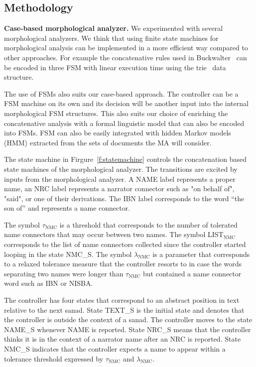 \documentclass[12pt]{article}
\begin{document}
\subsection{Methodology}

\begin{figure}
\end{figure}

{\bf Case-based morphological analyzer.}
We experimented with several morphological analyzers.
We think that using finite state machines for morphological analysis
can be implemented in a more efficient way compared to other 
approaches. 
For example the concatenative rules used in Buckwalter~\cite{Tim04}
can be encoded in three FSM with linear execution time using 
the trie~\cite{datries} data structure. 

The use of FSMs also suits our case-based approach. 
The controller can be a FSM machine on its own and its decision
will be another input into the internal morphological FSM structures. 
This also suits our choice of enriching the concatenative analysis
with a formal linguistic model that can also be encoded into FSMs. 
FSM can also be easily integrated with hidden Markov models (HMM)
extracted from the sets of documents the MA will consider. 

The state machine in Firgure~\ref{f:statemachine} controls 
the concatenation based state machines of the morphological
analyzer.
The transitions are excited
by inputs from the morphological analyzer. 
A NAME label represents a proper name, 
an NRC label represents a narrator connector such as
 "on behalf of",  "said", 
or one of their derivations. 
The IBN label corresponds to the word  
``the son of'' and represents a name connector.

The symbol $\tau_{\mbox{NMC}}$ is a threshold
that corresponds to the number of tolerated name connectors 
that may occur between two names. 
The symbol LIST$_{\mbox{NMC}}$ corresponds to the list 
of name connectors collected since the controller
started looping in the state NMC\_S. 
The symbol $\lambda_{\mbox{NMC}}$ is a parameter 
that corresponds to a relaxed tolerance measure that
the controller resorts to in case the words separating
two names were longer than $\tau_{\mbox{NMC}}$ but 
contained a name connector word such as IBN or NISBA.

The controller has four states that correspond to 
an abstract position in text relative to the next sanad. 
State TEXT\_S is the initial state and denotes that
the controller is outside the context of a sanad.
The controller moves to the state NAME\_S whenever
NAME is reported.
State NRC\_S means that the controller thinks it is in the context
of a narrator name after an NRC is reported.
State NMC\_S
indicates that the controller expects a name to appear within 
a tolerance threshold expressed by 
$\tau_{\mbox{NMC}}$ and $\lambda_{\mbox{NMC}}$.
\end{document}
